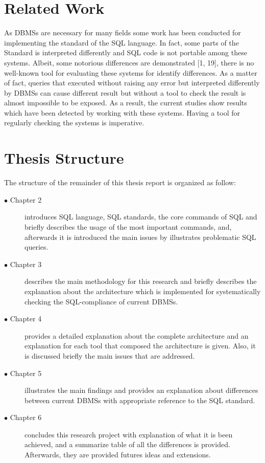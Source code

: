 \section{Related Work }
As DBMSs are necessary for many fields some work has been conducted for implementing the standard of the SQL language. In fact, some parts of the Standard is interpreted differently and SQL code is not portable among these systems. Albeit, some notorious differences are demonstrated [1, 19], there is no well-known tool for evaluating these systems for identify differences. As a matter of fact, queries that executed without raising any error but interpreted differently by DBMSs can cause different result but without a tool to check the result is almost impossible to be exposed.  As a result, the current studies show results which have been detected by working with these systems. Having a tool for regularly checking the systems is imperative. 
 
 \section{Thesis Structure}

 The structure of the remainder of this thesis report is organized as follow:
 \begin{description}
   \item[$\bullet$ Chapter 2] introduces SQL language, SQL standards, the core commands of SQL and briefly describes the usage of the most important commands, and, afterwards it is introduced the main issues by illustrates problematic SQL queries. 
   
	\item[$\bullet$ Chapter 3] describes the main methodology for this research and briefly describes the explanation about the architecture which is implemented for systematically checking the SQL-compliance of current DBMSs.
   
   \item[$\bullet$ Chapter 4] provides a detailed explanation about the complete architecture and an explanation for each tool that composed the architecture is given. Also, it is discussed briefly the main issues that  are  addressed.

  \item[$\bullet$ Chapter 5] illustrates the main findings and provides an explanation about differences between current DBMSs with appropriate reference to the SQL standard. 

  \item[$\bullet$ Chapter 6] concludes this research project with explanation of what it is been achieved, and a summarize table of all the differences is provided. Afterwards,  they are provided futures ideas and extensions.  

   
\end{description} 

 
 
